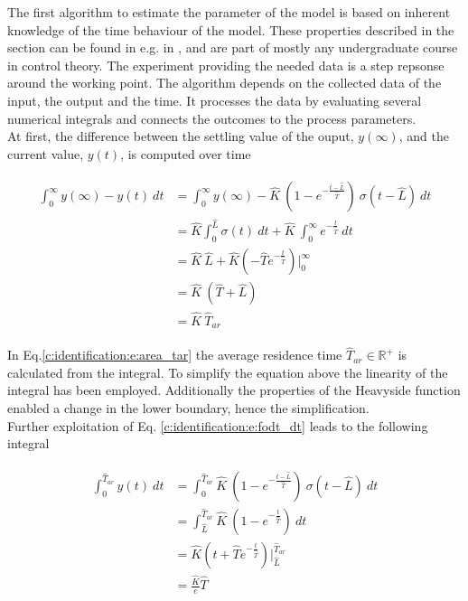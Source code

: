The first algorithm to estimate the parameter of the model is based on inherent knowledge of the time behaviour of the model. These properties described in the section can be found in e.g. in \cite{Bi1999}, \cite{Fedele2009a} and are part of mostly any undergraduate course in control theory. The experiment providing the needed data is a step repsonse around the working point. The algorithm depends on the collected data of the input, the output and the time. It processes the data by evaluating several numerical integrals and connects the outcomes to the process parameters.\\

At first, the difference between the settling value of the ouput, $y(\infty)$, and the current value, $y(t)$, is computed over time

\begin{align}
\begin{split}
\int_0^\infty y(\infty)-y(t)~dt &= \int_0^\infty y(\infty) - \hat{K} ~\left( 1 - e^{-\frac{t- \hat{L}}{\hat{T}}}\right)~ \sigma(t-\hat{L}) ~dt \\
&= \hat{K} {\int_0^\hat{L}} \sigma(t) ~dt + \hat{K}~{\int^\infty_0} e^{-\frac{t}{\hat{T}}} ~dt \\
&= \hat{K}~\hat{L} + \hat{K} \left( -\hat{T} e^{-\frac{t}{\hat{T}}}\right) \Bigg\rvert^\infty_0 \\
&= \hat{K}~\left(\hat{T}+\hat{L}\right) \\
&= \hat{K}~\hat{T}_{ar}
\end{split}
\label{c:identification:e:area_tar}
\end{align}

In Eq.\ref{c:identification:e:area_tar} the average residence time $\hat{T}_{ar} \in \mathbb{R}^+$ is calculated from the integral. To simplify the equation above the linearity of the integral has been employed. Additionally the properties of the Heavyside function enabled a change in the lower boundary, hence the simplification.\\

Further exploitation of Eq. \ref{c:identification:e:fodt_dt} leads to the following integral

\begin{align}
\begin{split}
\int_0^{\hat{T}_{ar}} y(t) ~dt &= \int_0^{\hat{T}_{ar}} \hat{K} ~\left( 1 - e^{-\frac{t- \hat{L}}{\hat{T}}}\right)~ \sigma(t-\hat{L}) ~dt \\
&= \int_{\hat{L}}^{\hat{T}_{ar}} \hat{K} ~\left( 1 - e^{-\frac{t}{\hat{T}}}\right)~dt \\
&= \hat{K} \left( t + \hat{T} e^{-\frac{t}{\hat{T}}} \right) \Bigg\rvert_{\hat{L}}^{\hat{T}_{ar}} \\
&= \frac{\hat{K}}{e} \hat{T}
\end{split}
\label{c:identification:e:area_t}
\end{align}

